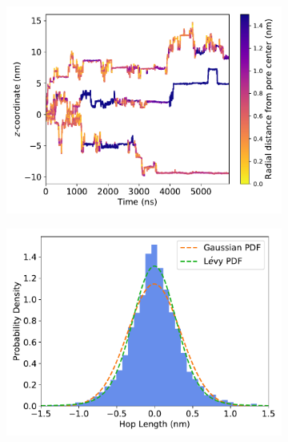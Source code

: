 \documentclass{article}
\begin{document}
  \begin{figure}
  \centering
  \begin{subfigure}{0.45\textwidth}
  \includegraphics[width=\textwidth]{MET_trajectories.pdf}
  \caption{}\label{fig:MET_solute_trajectories}
  \end{subfigure}
  \begin{subfigure}{0.45\textwidth}
  \includegraphics[width=\textwidth]{gaussian_levy_comparison_anomalous_MET.pdf}
  \caption{}\label{fig:MET_hop_distribution_comparison}
  \end{subfigure}

\end{figure}
\end{document}
